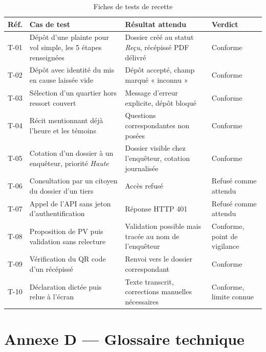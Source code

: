 \begin{table}[H]
    \centering
    \begin{tabularx}{\textwidth}{|l|>{\raggedright\arraybackslash}X|>{\raggedright\arraybackslash}X|l|}
        \hline
        \textbf{Réf.} & \textbf{Cas de test} & \textbf{Résultat attendu} & \textbf{Verdict} \\
        \hline
        T-01 & Dépôt d'une plainte pour vol simple, les 5 étapes renseignées & Dossier créé au statut \textit{Reçu}, récépissé PDF délivré & Conforme \\
        \hline
        T-02 & Dépôt avec identité du mis en cause laissée vide & Dépôt accepté, champ marqué « inconnu » & Conforme \\
        \hline
        T-03 & Sélection d'un quartier hors ressort couvert & Message d'erreur explicite, dépôt bloqué & Conforme \\
        \hline
        T-04 & Récit mentionnant déjà l'heure et les témoins & Questions correspondantes non posées & Conforme \\
        \hline
        T-05 & Cotation d'un dossier à un enquêteur, priorité \textit{Haute} & Dossier visible chez l'enquêteur, cotation journalisée & Conforme \\
        \hline
        T-06 & Consultation par un citoyen du dossier d'un tiers & Accès refusé & Refusé comme attendu \\
        \hline
        T-07 & Appel de l'API sans jeton d'authentification & Réponse HTTP 401 & Refusé comme attendu \\
        \hline
        T-08 & Proposition de PV puis validation sans relecture & Validation possible mais tracée au nom de l'enquêteur & Conforme, point de vigilance \\
        \hline
        T-09 & Vérification du QR code d'un récépissé & Renvoi vers le dossier correspondant & Conforme \\
        \hline
        T-10 & Déclaration dictée puis relue à l'écran & Texte transcrit, corrections manuelles nécessaires & Conforme, limite connue \\
        \hline
    \end{tabularx}
    \caption{Fiches de tests de recette}
    \label{tab:fiches_tests}
\end{table}

\section*{Annexe D — Glossaire technique}


